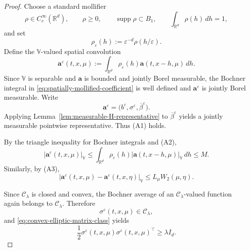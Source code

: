 \documentclass[12pt,oneside, reqno]{amsart}
\numberwithin{equation}{section}
\begin{document}
\begin{proof}
	Choose a standard mollifier
	\[
	\rho\in C_c^\infty(\mathbb R^d),
	\qquad
	\rho\geq0,
	\qquad
	\operatorname{supp}\rho\subset B_1,
	\qquad
	\int_{\mathbb R^d}\rho(h)\,dh=1,
	\]
	and set
	\[
	\rho_\varepsilon(h)
	:=
	\varepsilon^{-d}\rho(h/\varepsilon).
	\]
	Define the \(\mathbb V\)-valued spatial convolution
	\begin{equation}
		\label{eq:spatially-mollified-coefficient}
		\mathbf a^\varepsilon(t,x,\mu)
		:=
		\int_{\mathbb R^d}
		\rho_\varepsilon(h)
		\mathbf a(t,x-h,\mu)\,dh.
	\end{equation}
	Since \(\mathbb V\) is separable and \(\mathbf a\) is bounded and
	jointly Borel measurable, the Bochner integral in
	\eqref{eq:spatially-mollified-coefficient} is well defined and
	\(\mathbf a^\varepsilon\) is jointly Borel measurable. Write
	\[
	\mathbf a^\varepsilon
	=
	\bigl(
	b^\varepsilon,
	\sigma^\varepsilon,
	\overline\beta^\varepsilon
	\bigr).
	\]
	Applying Lemma~\ref{lem:measurable-H-representative} to
	\(\overline\beta^\varepsilon\) yields a jointly measurable pointwise
	representative. Thus \textnormal{(A1)} holds.
	
	By the triangle inequality for Bochner integrals and
	\textnormal{(A2)},
	\begin{equation}
		\label{eq:mollification-preserves-uniform-bound}
		\left|
		\mathbf a^\varepsilon(t,x,\mu)
		\right|_{\mathbb V}
		\leq
		\int_{\mathbb R^d}
		\rho_\varepsilon(h)
		\left|
		\mathbf a(t,x-h,\mu)
		\right|_{\mathbb V}\,dh
		\leq
		M.
	\end{equation}
	Similarly, by \textnormal{(A3)},
	\begin{equation}
		\label{eq:mollification-preserves-law-lipschitz}
		\left|
		\mathbf a^\varepsilon(t,x,\mu)
		-
		\mathbf a^\varepsilon(t,x,\eta)
		\right|_{\mathbb V}
		\leq
		L_\mu W_2(\mu,\eta).
	\end{equation}
	
	Since \(\mathcal C_\lambda\) is closed and convex, the Bochner average
	of an \(\mathcal C_\lambda\)-valued function again belongs to
	\(\mathcal C_\lambda\). Therefore
	\[
	\sigma^\varepsilon(t,x,\mu)
	\in
	\mathcal C_\lambda,
	\]
	and \eqref{eq:convex-elliptic-matrix-class} yields
	\begin{equation}
		\label{eq:mollification-preserves-ellipticity}
		\frac12
		\sigma^\varepsilon(t,x,\mu)
		\sigma^\varepsilon(t,x,\mu)^\top
		\geq
		\lambda I_d.
	\end{equation}
	

\end{proof}
\end{document}
